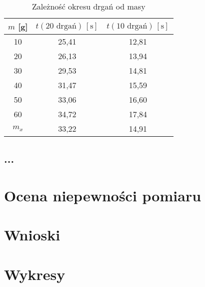 \documentclass[a4paper,12pt]{article}
\begin{document}
\begin{table}[H]
    \centering
    \begin{tabular}{|c|c|c|}
        \hline
        $m$ [g] & $t(20 \text{ drgań})\,[\text{s}]$ & $t(10 \text{ drgań})\,[\text{s}]$ \\
        \hline
        10 & 25,41 & 12,81 \\
        20 & 26,13 & 13,94 \\
        30 & 29,53 & 14,81 \\
        40 & 31,47 & 15,59 \\
        50 & 33,06 & 16,60 \\
        60 & 34,72 & 17,84 \\
        $m_x$ & 33,22 & 14,91 \\
        \hline
    \end{tabular}
    \caption{Zależność okresu drgań od masy}
\end{table}



\subsection{...}

\section{Ocena niepewności pomiaru}

\section{Wnioski}

\section{Wykresy}



\end{document}
